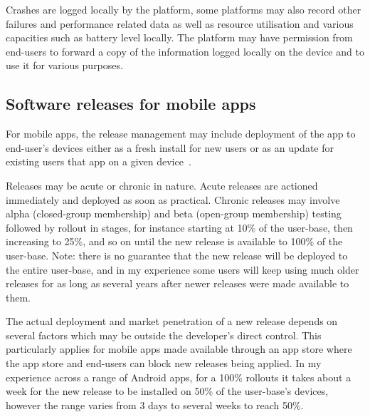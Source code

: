 Crashes are logged locally by the platform, some platforms may also record other failures and performance related data as well as resource utilisation and various capacities such as battery level locally. The platform may have permission from end-users to forward a copy of the information logged locally on the device and to use it for various purposes.  

\subsection{Software releases for mobile apps}
For mobile apps, the release management may include deployment of the app to end-user's devices either as a fresh install for new users or as an update for existing users that app on a given device~.

Releases may be acute or chronic in nature. Acute releases are actioned immediately and deployed as soon as practical. Chronic releases may involve alpha (closed-group membership) and beta (open-group membership) testing followed by rollout in stages, for instance starting at 10\% of the user-base, then increasing to 25\%, and so on until the new release is available to 100\% of the user-base. Note: there is no guarantee that the new release will be deployed to the entire user-base, and in my experience some users will keep using much older releases for as long as several years after newer releases were made available to them. 

The actual deployment and market penetration of a new release depends on several factors which may be outside the developer's direct control. This particularly applies for mobile apps made available through an app store where the app store and end-users can block new releases being applied. In my experience across a range of Android apps, for a 100\% rollouts it takes about a week for the new release to be installed on 50\% of the user-base's devices, however the range varies from 3 days to several weeks to reach 50\%.  

